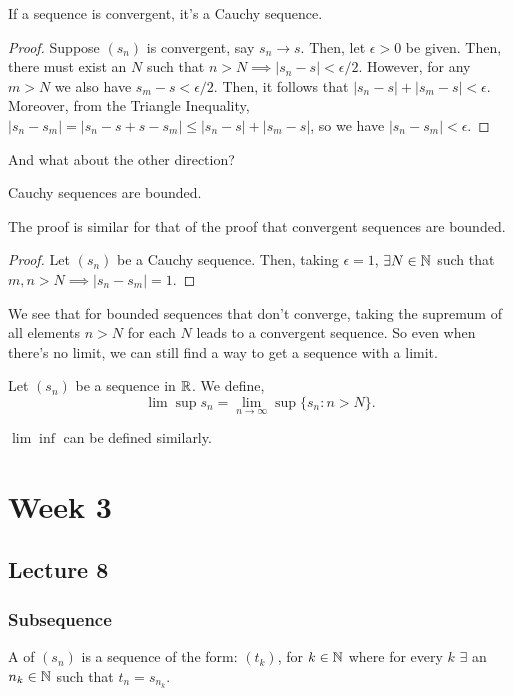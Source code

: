 \documentclass{book}
\begin{document}
\begin{lemma}
    If a sequence is convergent, it's a Cauchy sequence.
\end{lemma}

\begin{proof}
    Suppose $(s_n)$ is convergent, say $s_n \to s$. Then, let $\epsilon > 0$ be given. Then, there must exist an $N$ such that $n > N \implies |s_n - s| < \epsilon/2$. However, for any $m > N$ we also have $s_m - s < \epsilon/2$. Then, it follows that $|s_n - s| + |s_m - s| < \epsilon$. Moreover, from the Triangle Inequality, $|s_n - s_m| = |s_n - s + s - s_m| \leq |s_n - s| + |s_m - s|$, so we have $|s_n - s_m| < \epsilon$.
\end{proof} 

And what about the other direction?
\begin{lemma}
    Cauchy sequences are bounded.
\end{lemma}

The proof is similar for that of the proof that convergent sequences are bounded.

\begin{proof}
    Let $(s_n)$ be a Cauchy sequence. Then, taking $\epsilon = 1$, $\exists N \in \mathbb{N}$ such that $m, n > N \implies |s_n - s_m| = 1$. 
\end{proof}

We see that for bounded sequences that don't converge, taking the supremum of all elements $n > N$ for each $N$ leads to a convergent sequence. So even when there's no limit, we can still find a way to get a sequence with a limit.

\begin{defn}[$\lim \sup$]
    Let $(s_n)$ be a sequence in $\mathbb{R}$. We define,
    \[\lim \sup s_n = \lim_{n \to \infty} \sup \{s_n : n > N\}.\] 

    $\lim \inf$ can be defined similarly.
\end{defn}

\chapter{Week 3}
\section{Lecture 8}
\subsection{Subsequence}
\begin{defn}[Subsequence]
    A  of $(s_n)$ is a sequence of the form: $(t_k)$, for $k \in \mathbb{N}$ where for every $k$ $\exists$ an $n_k \in \mathbb{N}$ such that $t_n = s_{n_k}$.
\end{defn}
\end{document}
